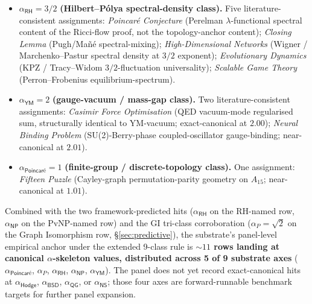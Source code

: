 \documentclass[11pt,a4paper]{amsart}
\theoremstyle{plain}
\theoremstyle{definition}
\begin{document}
\begin{itemize}[itemsep=2pt,leftmargin=2em]
\item $\alpha_{\textsf{RH}} = 3/2$ \textbf{(Hilbert--P\'olya spectral-density class).} Five literature-consistent assignments: \emph{Poincar\'e Conjecture} (Perelman $\lambda$-functional spectral content of the Ricci-flow proof, not the topology-anchor content); \emph{Closing Lemma} (Pugh/Ma\~n\'e spectral-mixing); \emph{High-Dimensional Networks} (Wigner / Marchenko--Pastur spectral density at $3/2$ exponent); \emph{Evolutionary Dynamics} (KPZ / Tracy--Widom $3/2$-fluctuation universality); \emph{Scalable Game Theory} (Perron--Frobenius equilibrium-spectrum).
\item $\alpha_{\textsf{YM}} = 2$ \textbf{(gauge-vacuum / mass-gap class).} Two literature-consistent assignments: \emph{Casimir Force Optimisation} (QED vacuum-mode regularised sum, structurally identical to YM-vacuum; exact-canonical at $2.00$); \emph{Neural Binding Problem} (SU(2)-Berry-phase coupled-oscillator gauge-binding; near-canonical at $2.01$).
\item $\alpha_{\textsf{Poincar\'e}} = 1$ \textbf{(finite-group / discrete-topology class).} One assignment: \emph{Fifteen Puzzle} (Cayley-graph permutation-parity geometry on $A_{15}$; near-canonical at $1.01$).
\end{itemize}

Combined with the two framework-predicted hits ($\alpha_{\textsf{RH}}$ on the RH-named row, $\alpha_{\textsf{NP}}$ on the PvNP-named row) and the GI tri-class corroboration ($\alpha_P = \sqrt{2}$ on the Graph Isomorphism row, \S\ref{sec:predictive}), the substrate's panel-level empirical anchor under the extended 9-class rule is \textbf{$\sim 11$ rows landing at canonical $\alpha$-skeleton values, distributed across 5 of 9 substrate axes} ($\alpha_{\textsf{Poincar\'e}}$, $\alpha_P$, $\alpha_{\textsf{RH}}$, $\alpha_{\textsf{NP}}$, $\alpha_{\textsf{YM}}$). The panel does not yet record exact-canonical hits at $\alpha_{\textsf{Hodge}}$, $\alpha_{\textsf{BSD}}$, $\alpha_{\textsf{QG}}$, or $\alpha_{\textsf{NS}}$; those four axes are forward-runnable benchmark targets for further panel expansion.
\end{document}
